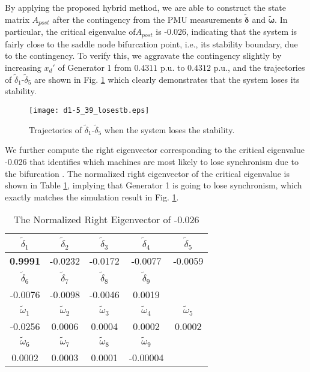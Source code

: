 \documentclass[journal]{IEEEtran}
\begin{document}
By applying the proposed hybrid method, we are able to construct the state matrix $A_{post}$ after the contingency from the PMU measurements $\bm{\tilde{\delta}}$ and $\bm{\tilde{\omega}}$. In particular, the critical eigenvalue of$A_{post}$ is -0.026, indicating that the system is fairly close to the saddle node bifurcation point, i.e., its stability boundary, due to the contingency. To verify this, we aggravate the contingency slightly by increasing $x_d'$ of Generator 1 from $0.4311$ p.u. to $0.4312$ p.u., and the trajectories of  $\tilde{\delta}_{1}$-$\tilde{\delta}_{5}$ are shown in Fig. \ref{d1-5-afterSNB} which clearly demonstrates that the system loses its stability.
\begin{figure}[!ht]
\centering
\texttt{[image: d1-5\_39\_losestb.eps]}\caption{Trajectories of $\tilde{\delta}_{1}$-$\tilde{\delta}_{5}$ when the system loses the stability.}\label{d1-5-afterSNB}
\end{figure}

We further compute the right eigenvector corresponding to the critical eigenvalue -0.026 that identifies which machines are most likely to lose synchronism due to the bifurcation \cite{Cutsem:book}\cite{Vournas:1998}. The normalized right eigenvector of the critical eigenvalue is shown in Table \ref{39-stbRE}, implying that Generator 1 is going to lose synchronism, which exactly matches the simulation result in Fig. {\ref{d1-5-afterSNB}}.

\begin{table}[!ht]
\centering
\caption{The Normalized Right Eigenvector of -0.026}\label{39-stbRE}
\begin{tabular}{|c|c|c|c|c|}
\hline
$\tilde{\delta}_1$& $\tilde{\delta}_2$&$\tilde{\delta}_3$&$\tilde{\delta}_4$&$\tilde{\delta}_5$\\
\hline
\textbf{0.9991}&-0.0232&-0.0172&-0.0077&-0.0059\\
\hline
$\tilde{\delta}_6$& $\tilde{\delta}_7$&$\tilde{\delta}_8$&$\tilde{\delta}_9$&\\
\hline
-0.0076&-0.0098&-0.0046&0.0019&\\
\hline
$\tilde{\omega}_1$&$\tilde{\omega}_2$& $\tilde{\omega}_3$&$\tilde{\omega}_4$&$\tilde{\omega}_5$\\
\hline
-0.0256&0.0006&0.0004&0.0002&0.0002\\
\hline
$\tilde{\omega}_6$&$\tilde{\omega}_7$& $\tilde{\omega}_8$&$\tilde{\omega}_9$&\\
\hline
0.0002&0.0003&0.0001&-0.00004&\\
\hline
\end{tabular}
\end{table}
\end{document}
